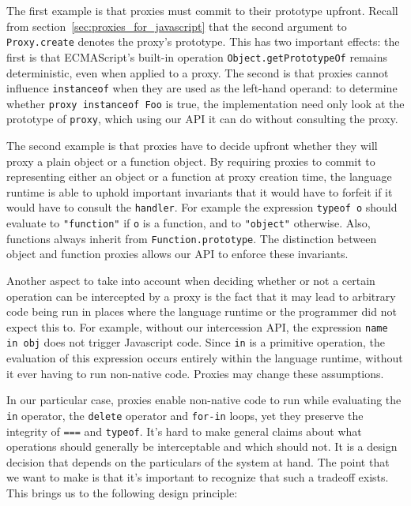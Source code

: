 \documentclass{sig-alternate}
\begin{document}
The first example is that proxies must commit to their prototype upfront. Recall from section~\ref{sec:proxies_for_javascript} that the second argument to \texttt{Proxy.create} denotes the proxy's prototype. This has two important effects: the first is that ECMAScript's built-in operation \texttt{Object.getPrototypeOf} remains deterministic, even when applied to a proxy. The second is that proxies cannot influence \texttt{instanceof} when they are used as the left-hand operand: to determine whether \texttt{proxy instanceof Foo} is true, the implementation need only look at the prototype of \texttt{proxy}, which using our API it can do without consulting the proxy.

The second example is that proxies have to decide upfront whether they will proxy a plain object or a function object. By requiring proxies to commit to representing either an object or a function at proxy creation time, the language runtime is able to uphold important invariants that it would have to forfeit if it would have to consult the \texttt{handler}. For example the expression \texttt{typeof o} should evaluate to \texttt{"function"} if \texttt{o} is a function, and to \texttt{"object"} otherwise. Also, functions always inherit from \texttt{Function.prototype}. The distinction between object and function proxies allows our API to enforce these invariants.

Another aspect to take into account when deciding whether or not a certain operation can be intercepted by a proxy is the fact that it may lead to arbitrary code being run in places where the language runtime or the programmer did not expect this to. For example, without our intercession API, the expression \texttt{name in obj} does not trigger Javascript code. Since \texttt{in} is a primitive operation, the evaluation of this expression occurs entirely within the language runtime, without it ever having to run non-native code. Proxies may change these assumptions.

In our particular case, proxies enable non-native code to run while evaluating the \texttt{in} operator, the \texttt{delete} operator and \texttt{for-in} loops, yet they preserve the integrity of \texttt{===} and \texttt{typeof}. It's hard to make general claims about what operations should generally be interceptable and which should not. It is a design decision that depends on the particulars of the system at hand. The point that we want to make is that it's important to recognize that such a tradeoff exists. This brings us to the following design principle:
\end{document}
